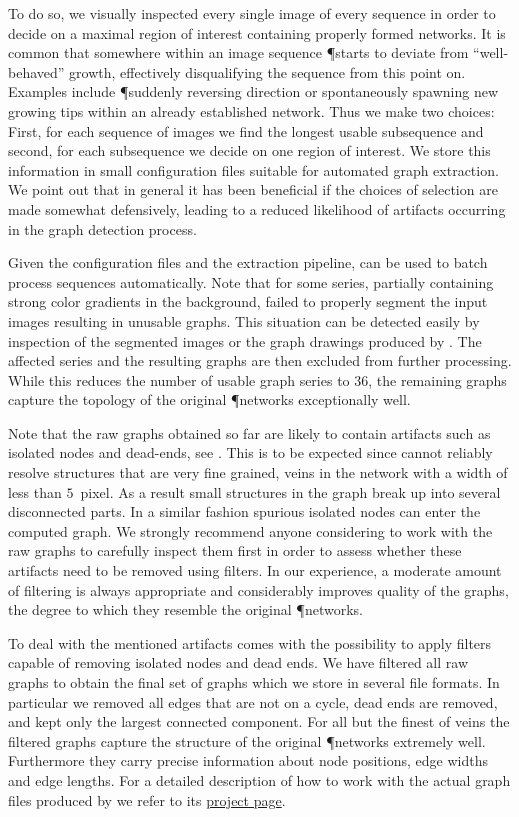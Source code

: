 		To do so, we visually inspected every single image of every sequence in order to decide on a maximal region of interest containing properly formed networks. It is common that somewhere within an image sequence \P starts to deviate from ``well-behaved'' growth, effectively disqualifying the sequence from this point on. Examples include \P suddenly reversing direction or spontaneously spawning new growing tips within an already established network. Thus we make two choices: First, for each sequence of images we find the longest usable subsequence and second, for each subsequence we decide on one region of interest. We store this information in small configuration files suitable for automated graph extraction. We point out that in general it has been beneficial if the choices of selection are made somewhat defensively, leading to a reduced likelihood of artifacts occurring in the graph detection process.  

		Given the configuration files and the extraction pipeline, \NEFI can be used to batch process sequences automatically. Note that for some series, partially containing strong color gradients in the background, \NEFI failed to properly segment the input images resulting in unusable graphs. This situation can be detected easily by inspection of the segmented images or the graph drawings produced by \NEFI. The affected series and the resulting graphs are then excluded from further processing. While this reduces the number of usable graph series to $36$, the remaining graphs capture the topology of the original \P networks exceptionally well. 

		Note that the raw graphs obtained so far are likely to contain artifacts such as isolated nodes and dead-ends, see . This is to be expected since \NEFI cannot reliably resolve structures that are very fine grained, \eg veins in the network with a width of less than $5$~pixel. As a result small structures in the graph break up into several disconnected parts. In a similar fashion spurious isolated nodes can enter the computed graph. We strongly recommend anyone considering to work with the raw graphs to carefully inspect them first in order to assess whether these artifacts need to be removed using filters. In our experience, a moderate amount of filtering is always appropriate and considerably improves quality of the graphs, \ie the degree to which they resemble the original \P networks.

		To deal with the mentioned artifacts \NEFI comes with the possibility to apply filters capable of removing isolated nodes and dead ends. We have filtered all raw graphs to obtain the final set of graphs which we store in several file formats. In particular we removed all edges that are not on a cycle, \ie dead ends are removed, and kept only the largest connected component. For all but the finest of veins the filtered graphs capture the structure of the original \P networks extremely well. Furthermore they carry precise information about node positions, edge widths and edge lengths. For a detailed description of how to work with the actual graph files produced by \NEFI we refer to its \href{http://nefi.mpi-inf.mpg.de}{project page}.

